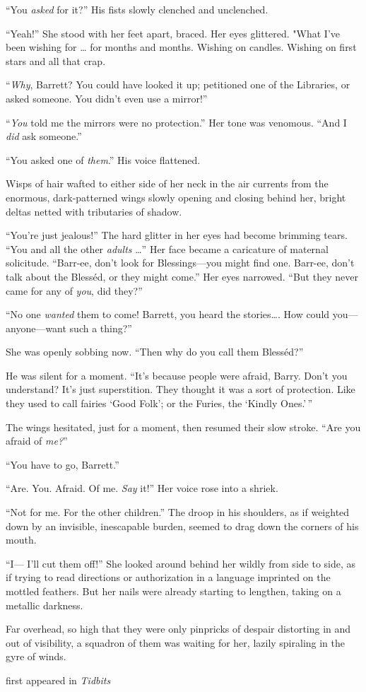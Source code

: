 ``You \emph{asked} for it?'' His fists slowly clenched and unclenched.

``Yeah!'' She stood with her feet apart, braced. Her eyes glittered.
"What I've been wishing for \ldots{} for months and months. Wishing on
candles. Wishing on first stars and all that crap.

``\emph{Why}, Barrett? You could have looked it up; petitioned one of
the Libraries, or asked someone. You didn't even use a mirror!''

``\emph{You} told me the mirrors were no protection.'' Her tone was
venomous. ``And I \emph{did} ask someone.''

``You asked one of \emph{them}.'' His voice flattened.

Wisps of hair wafted to either side of her neck in the air currents from
the enormous, dark-patterned wings slowly opening and closing behind
her, bright deltas netted with tributaries of shadow.

``You're just jealous!'' The hard glitter in her eyes had become
brimming tears. ``You and all the other \emph{adults} \ldots{}'' Her
face became a caricature of maternal solicitude. ``Barr-ee, don't look
for Blessings---you might find one. Barr-ee, don't talk about the
Blesséd, or they might come.'' Her eyes narrowed. ``But they never came
for any of \emph{you}, did they?''

``No one \emph{wanted} them to come! Barrett, you heard the
stories\ldots{}. How could you---anyone---want such a thing?''

She was openly sobbing now. ``Then why do you call them Blesséd?''

He was silent for a moment. ``It's because people were afraid, Barry.
Don't you understand? It's just superstition. They thought it was a sort
of protection. Like they used to call fairies `Good Folk'; or the
Furies, the `Kindly Ones.'\,''

The wings hesitated, just for a moment, then resumed their slow stroke.
``Are you afraid of \emph{me?}''

``You have to go, Barrett.''

``Are. You. Afraid. Of me. \emph{Say} it!'' Her voice rose into a
shriek.

``Not for me. For the other children.'' The droop in his shoulders, as
if weighted down by an invisible, inescapable burden, seemed to drag
down the corners of his mouth.

``I--- I'll cut them off!'' She looked around behind her wildly from
side to side, as if trying to read directions or authorization in a
language imprinted on the mottled feathers. But her nails were already
starting to lengthen, taking on a metallic darkness.

Far overhead, so high that they were only pinpricks of despair
distorting in and out of visibility, a squadron of them was waiting for
her, lazily spiraling in the gyre of winds.

first appeared in \emph{Tidbits}
